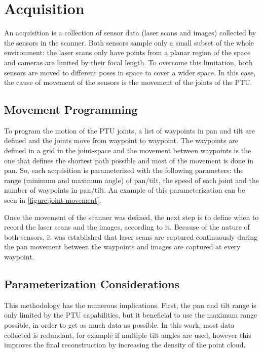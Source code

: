 \section{Acquisition}
\label{section:acquisition}

An acquisition is a collection of sensor data (laser scans and images) collected by the sensors in the scanner. Both sensors sample only a small subset of the whole environment: the laser scans only have points from a planar region of the space and cameras are limited by their focal length. To overcome this limitation, both sensors are moved to different poses in space to cover a wider space. In this case, the cause of movement of the sensors is the movement of the joints of the PTU. 

\subsection{Movement Programming}

To program the motion of the PTU joints, a list of waypoints in pan and tilt are defined and the joints move from waypoint to waypoint. The waypoints are defined in a grid in the joint-space and the movement between waypoints is the one that defines the shortest path possible and most of the movement is done in pan. So, each acquisition is parameterized with the following parameters: the range (minimum and maximum angle) of pan/tilt, the speed of each joint and the number of waypoints in pan/tilt. An example of this parameterization can be seen in \cref{figure:joint-movement}.

Once the movement of the scanner was defined, the next step is to define when to record the laser scans and the images, according to it. Because of the nature of both sensors, it was established that laser scans are captured continuously during the pan movement between the waypoints and images are captured at every waypoint.



\subsection{Parameterization Considerations}

This methodology has the numerous implications. First, the pan and tilt range is only limited by the PTU capabilities, but it beneficial to use the maximum range possible, in order to get as much data as possible. In this work, most data collected is redundant, for example if multiple tilt angles are used, however this improves the final reconstruction by increasing the density of the point cloud.

